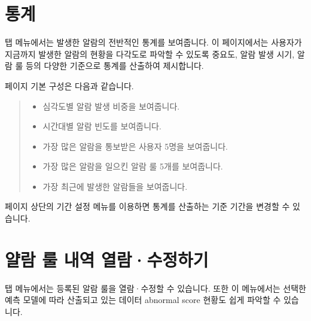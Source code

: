 \documentclass[letterpaper,10pt,english]{sphinxmanual}
\begin{document}
\chapter{통계}
\label{\detokenize{part03/index:statistics}}\label{\detokenize{part03/index:id1}}\label{\detokenize{part03/index::doc}}
 탭 메뉴에서는 발생한 알람의 전반적인 통계를 보여줍니다. 이 페이지에서는 사용자가 지금까지 발생한 알람의 현황을 다각도로 파악할 수 있도록 중요도, 알람 발생 시기, 알람 룰 등의 다양한 기준으로 통계를 산출하여 제시합니다.

페이지 기본 구성은 다음과 같습니다.
\begin{quote}

\begin{figure}[H]
\centering

\noindent{}
\end{figure}
\begin{itemize}
\item {} 
 심각도별 알람 발생 비중을 보여줍니다.

\item {} 
 시간대별 알람 빈도를 보여줍니다.

\item {} 
 가장 많은 알람을 통보받은 사용자 5명을 보여줍니다.

\item {} 
 가장 많은 알람을 일으킨 알람 룰 5개를 보여줍니다.

\item {} 
 가장 최근에 발생한 알람들을 보여줍니다.

\end{itemize}
\end{quote}

페이지 상단의 기간 설정 메뉴를 이용하면 통계를 산출하는 기준 기간을 변경할 수 있습니다.
\begin{quote}

\begin{figure}[H]
\centering

\noindent{}
\end{figure}
\end{quote}


\chapter{얄람 룰 내역 열람·수정하기}
\label{\detokenize{part04/index:id1}}\label{\detokenize{part04/index::doc}}
 탭 메뉴에서는 등록된 알람 룰을 열람·수정할 수 있습니다. 또한 이 메뉴에서는 선택한 예측 모델에 따라 산출되고 있는 데이터 abnormal score 현황도 쉽게 파악할 수 있습니다.
\end{document}
